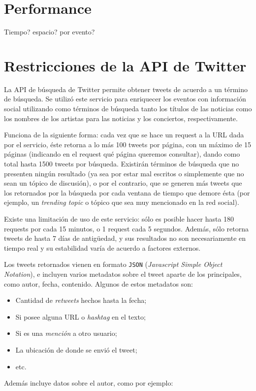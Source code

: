 \documentclass[upright, contnum]{umemoria}
\begin{document}
{\section{Performance}
\label{sec-6.3}


Tiempo? espacio? por evento?

\section{Restricciones de la API de Twitter}
\label{sec-6.4}


   La API de búsqueda de Twitter permite obtener tweets de acuerdo a un
   término de búsqueda. Se utilizó este servicio para enriquecer los
   eventos con información social utilizando como términos de búsqueda
   tanto los títulos de las noticias como los nombres de los artistas
   para las noticias y los conciertos, respectivamente. 
   
   Funciona de la siguiente forma: cada vez que se hace un request a la
   URL dada por el servicio, éste retorna a lo más 100 tweets por página, con un
   máximo de 15 páginas (indicando en el request qué página queremos
   consultar), dando como total hasta 1500 tweets por búsqueda. Existirán
   términos de búsqueda que no presenten ningún resultado  (ya sea por
   estar mal escritos o simplemente que no sean un tópico de discusión), o por
   el contrario, que se generen más tweets que los retornados por la
   búsqueda por cada ventana de tiempo que demore ésta (por ejemplo, un
   \emph{trending topic} o tópico que sea muy mencionado en la red social).
   
   Existe una limitación de uso de este servicio: sólo es posible hacer
   hasta 180 requests por cada 15 minutos, o 1 request cada 5
   segundos. Además, sólo retorna tweets de hasta 7 días de antigüedad, y
   sus resultados no son necesariamente en tiempo real y su estabilidad
   varía de acuerdo a factores externos.
   
   Los tweets retornados vienen en formato \texttt{JSON} (\emph{Javascript Simple Object Notation}),
   e incluyen varios metadatos sobre el tweet aparte de los principales,
   como autor, fecha, contenido. Algunos de estos metadatos son:
   
\begin{itemize}
\item Cantidad de \emph{retweets} hechos hasta la fecha;
\item Si posee alguna URL o \emph{hashtag} en el texto;
\item Si es una \emph{mención} a otro usuario;
\item La ubicación de donde se envió el tweet;
\item etc.
\end{itemize}
  Además incluye datos sobre el autor, como por ejemplo:

}
\end{document}
